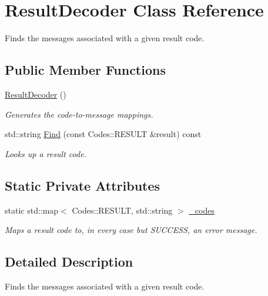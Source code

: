 \hypertarget{classResultDecoder}{
\section{ResultDecoder Class Reference}
\label{classResultDecoder}
}


Finds the messages associated with a given result code.  


\subsection*{Public Member Functions}
\begin{DoxyCompactItemize}
\item 
\hypertarget{classResultDecoder_afafd3458bdbcbd7b1b95545f47151358}{
\hyperlink{classResultDecoder_afafd3458bdbcbd7b1b95545f47151358}{ResultDecoder} ()}
\label{classResultDecoder_afafd3458bdbcbd7b1b95545f47151358}

\begin{DoxyCompactList}\small\item\em Generates the code-\/to-\/message mappings. \item\end{DoxyCompactList}\item 
std::string \hyperlink{classResultDecoder_ace7c2719b4f9de2a5e25fccfddc6d8f4}{Find} (const Codes::RESULT \&result) const 
\begin{DoxyCompactList}\small\item\em Looks up a result code. \item\end{DoxyCompactList}\end{DoxyCompactItemize}
\subsection*{Static Private Attributes}
\begin{DoxyCompactItemize}
\item 
static std::map$<$ Codes::RESULT, std::string $>$ \hyperlink{classResultDecoder_ab19497e41c5d1a0546ed33642cad48dd}{\_\-codes}
\begin{DoxyCompactList}\small\item\em Maps a result code to, in every case but SUCCESS, an error message. \item\end{DoxyCompactList}\end{DoxyCompactItemize}


\subsection{Detailed Description}
Finds the messages associated with a given result code. 

